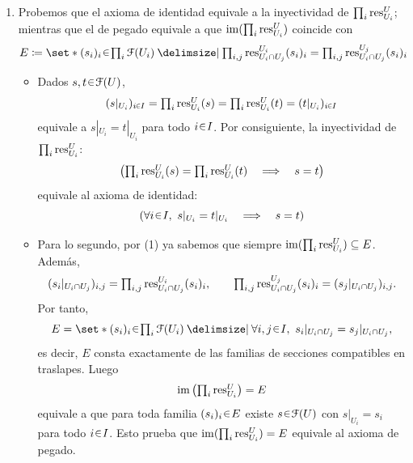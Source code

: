 \begin{sol}
\begin{enumerate}
\item 
Probemos que el axioma de identidad equivale a la inyectividad de $\prod_i\operatorname{res}^U_{U_i}$; mientras que el de pegado equivale a que $\operatorname{im}(\prod_i\operatorname{res}^U_{U_i})$ coincide con
\[\textstyle
E\coloneq\set*{(s_i)_i\en\prod_i\mathcal{F}(U_i)\given
\prod_{i,j}\res^{U_i}_{U_i\cap U_j}(s_i)_i
=\prod_{i,j}\res^{U_j}_{U_i\cap U_j}(s_i)_i}
\]
    \begin{itemize}
    \item Dados $s,t\en\mathcal{F}(U)$,
    \[\textstyle
    (s|_{U_i})_{i\en I}=\prod_i\res^U_{U_i}(s)
    =\prod_i\res^U_{U_i}(t)=(t|_{U_i})_{i\en I}
    \]
    equivale a $s|_{U_i}=t|_{U_i}$ para todo $i\en I$. Por consiguiente, la inyectividad de $\prod_i\operatorname{res}^U_{U_i}$:
    \[\textstyle
    \left(\prod_i\operatorname{res}^U_{U_i}(s)=\prod_i\operatorname{res}^U_{U_i}(t)\quad\Longrightarrow\quad s=t\right)
    \]
    equivale al axioma de identidad:
    \[
    \left(\forall i\en I,\ s|_{U_i}=t|_{U_i} \quad\Longrightarrow\quad s=t\right)
    \]

    \item Para lo segundo, por (1) ya sabemos que siempre $\operatorname{im}(\prod_i\operatorname{res}^U_{U_i})\subseteq E$. Además,
    \[\textstyle
    (s_i|_{U_i\cap U_j})_{i,j}
    =\prod_{i,j}\operatorname{res}^{U_i}_{U_i\cap U_j}(s_i)_i,
    \qquad
    \prod_{i,j}\operatorname{res}^{U_j}_{U_i\cap U_j}(s_i)_i
    =(s_j|_{U_i\cap U_j})_{i,j}.
    \]
    Por tanto,
    \[\textstyle
    E=\set*{(s_i)_i\en\prod_i\mathcal{F}(U_i)\given
    \forall i,j\en I,\ s_i|_{U_i\cap U_j}=s_j|_{U_i\cap U_j}},
    \]
    es decir, $E$ consta exactamente de las familias de secciones compatibles en traslapes. Luego
    \[\textstyle
    \operatorname{im}\left(\prod_i\operatorname{res}^U_{U_i}\right)=E
    \]
    equivale a que para toda familia $(s_i)_i\en E$ existe $s\en\mathcal{F}(U)$ con $s|_{U_i}=s_i$ para todo $i\en I$. Esto prueba que $\operatorname{im}(\prod_i\operatorname{res}^U_{U_i})=E$ equivale al axioma de pegado.
    \end{itemize}


\end{enumerate}
\end{sol}
